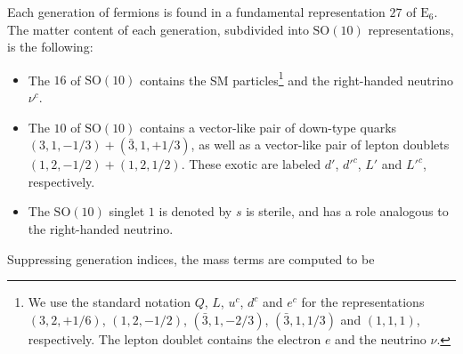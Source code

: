 \documentclass[a4paper,12pt]{article}
\def\SO{\mathrm{SO}}
\def\EE{\mathrm{E}_6}
\begin{document}
Each generation of fermions is found in a fundamental representation $27$ of $\EE$. The matter content of each generation, subdivided into $\SO(10)$ representations, is the following:
\begin{itemize}
\item The $16$ of $\SO(10)$ contains the SM particles\footnote{We use the standard notation $Q$, $L$, $u^c$, $d^c$ and $e^c$ for the representations $(3,2,+1/6)$, $(1,2,-1/2)$, $(\bar{3},1,-2/3)$, $(\bar{3},1,1/3)$ and $(1,1,1)$, respectively. The lepton doublet contains the electron $e$ and the neutrino $\nu$.} and the right-handed neutrino $\nu^c$.
\item The $10$ of $\SO(10)$ contains a vector-like pair of down-type quarks $(3,1,-1/3)+(\bar{3},1,+1/3)$, as well as a vector-like pair of lepton doublets $(1,2,-1/2)+(1,2,1/2)$. These exotic are labeled $d'$, $d'^c$, $L'$ and $L'^c$, respectively.
\item The $\SO(10)$ singlet $1$ is denoted by $s$ is sterile, and has a role analogous to the right-handed neutrino.
\end{itemize}
Suppressing generation indices, the mass terms are computed to be
\end{document}
